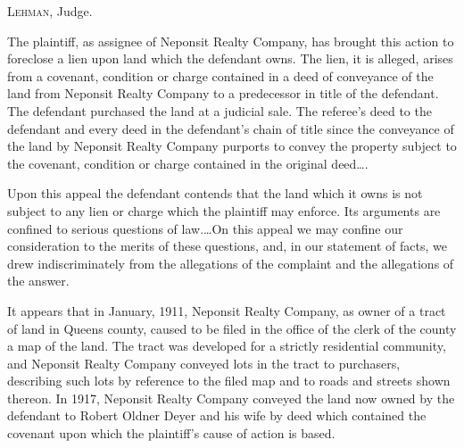 

\opinion \textsc{Lehman}, Judge.

The plaintiff, as assignee of Neponsit Realty Company, has brought this action
to foreclose a lien upon land which the defendant owns. The lien, it is alleged,
arises from a covenant, condition or charge contained in a deed of conveyance of
the land from Neponsit Realty Company to a predecessor in title of the
defendant. The defendant purchased the land at a judicial sale. The referee's
deed to the defendant and every deed in the defendant's chain of title since the
conveyance of the land by Neponsit Realty Company purports to convey the
property subject to the covenant, condition or charge contained in the original
deed\ldots .

Upon this appeal the defendant contends that the land which it owns is not
subject to any lien or charge which the plaintiff may enforce. Its arguments are
confined to serious questions of law.\ldots On this appeal we may confine our
consideration to the merits of these questions, and, in our statement of facts,
we drew indiscriminately from the allegations of the complaint and the
allegations of the answer.

It appears that in January, 1911, Neponsit Realty Company, as owner of a tract
of land in Queens county, caused to be filed in the office of the clerk of the
county a map of the land. The tract was developed for a strictly residential
community, and Neponsit Realty Company conveyed lots in the tract to purchasers,
describing such lots by reference to the filed map and to roads and streets
shown thereon. In 1917, Neponsit Realty Company conveyed the land now owned by
the defendant to Robert Oldner Deyer and his wife by deed which contained the
covenant upon which the plaintiff's cause of action is based.


